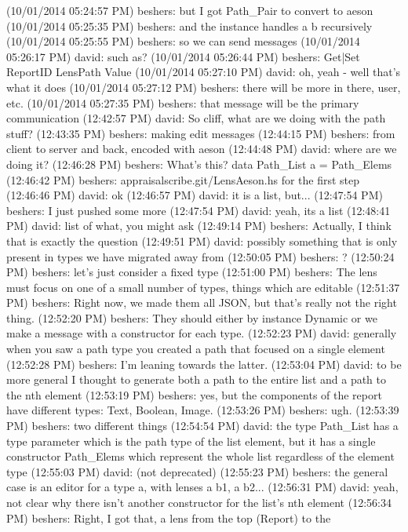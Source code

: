 (10/01/2014 05:24:57 PM) beshers: but I got Path_Pair to convert to aeson
(10/01/2014 05:25:35 PM) beshers: and the instance handles a b recursively
(10/01/2014 05:25:55 PM) beshers: so we can send messages
(10/01/2014 05:26:17 PM) david: such as?
(10/01/2014 05:26:44 PM) beshers: Get|Set ReportID LensPath Value
(10/01/2014 05:27:10 PM) david: oh, yeah - well that's what it does
(10/01/2014 05:27:12 PM) beshers: there will be more in there, user, etc.
(10/01/2014 05:27:35 PM) beshers: that message will be the primary communication
(12:42:57 PM) david: So cliff, what are we doing with the path stuff?
(12:43:35 PM) beshers: making edit messages
(12:44:15 PM) beshers: from client to server and back, encoded with aeson
(12:44:48 PM) david: where are we doing it?
(12:46:28 PM) beshers: What's this? data Path_List a = Path_Elems
(12:46:42 PM) beshers: appraisalscribe.git/LensAeson.hs for the first step
(12:46:46 PM) david: ok
(12:46:57 PM) david: it is a list, but...
(12:47:54 PM) beshers: I just pushed some more
(12:47:54 PM) david: yeah, its a list
(12:48:41 PM) david: list of what, you might ask
(12:49:14 PM) beshers: Actually, I think that is exactly the question
(12:49:51 PM) david: possibly something that is only present in types we have
migrated away from
(12:50:05 PM) beshers: ?
(12:50:24 PM) beshers: let's just consider a fixed type
(12:51:00 PM) beshers: The lens must focus on one of a small number of types,
things which are editable
(12:51:37 PM) beshers: Right now, we made them all JSON, but that's really not
the right thing.
(12:52:20 PM) beshers: They should either by instance Dynamic or we make a
message with a constructor for each type.
(12:52:23 PM) david: generally when you saw a path type you created a path that
focused on a single element
(12:52:28 PM) beshers: I'm leaning towards the latter.
(12:53:04 PM) david: to be more general I thought to generate both a path to
the entire list and a path to the nth element
(12:53:19 PM) beshers: yes, but the components of the report have different
types: Text, Boolean, Image.
(12:53:26 PM) beshers: ugh.
(12:53:39 PM) beshers: two different things
(12:54:54 PM) david: the type Path_List has a type parameter which is the path
type of the list element, but it has a single constructor Path_Elems which
represent the whole list regardless of the element type
(12:55:03 PM) david: (not deprecated)
(12:55:23 PM) beshers: the general case is an editor for a type a, with lenses
a b1, a b2...
(12:56:31 PM) david: yeah, not clear why there isn't another constructor for
the list's nth element
(12:56:34 PM) beshers: Right, I got that, a lens from the top (Report) to the
